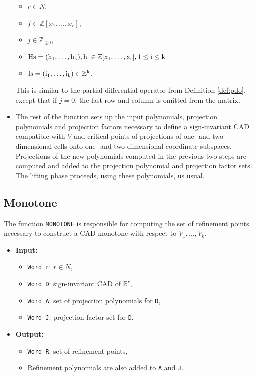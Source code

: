 \documentclass[
]{book}
\providecommand{\tightlist}{%
  \setlength{\itemsep}{0pt}\setlength{\parskip}{0pt}}
\theoremstyle{definition}
\theoremstyle{definition}
\theoremstyle{definition}
\theoremstyle{definition}
\theoremstyle{remark}
\begin{document}
\begin{itemize}
  \begin{itemize}
  \tightlist
  \item
    \(r \in N\),
  \item
    \(f \in \mathbb{Z}[x_1,\ldots,x_r]\),
  \item
    \(j \in \mathbb{Z}_{\ge 0}\)
  \item
    \(\rm{Hs} = (h_1,\ldots,h_k), h_i \in \mathbb{Z}[x_1,\ldots,x_r], 1 \le i \le k\)
  \item
    \(\rm{Is} = (i_1,\ldots,i_k) \in \mathbb{Z}^k\).
  \end{itemize}

  This is similar to the partial differential operator from Definition \ref{def:pdo}, except that if \(j = 0\), the last row and column is omitted from the matrix.
\item
  The rest of the function sets up the input polynomials, projection polynomials and projection factors necessary to define a sign-invariant CAD compatible with \(V\) and critical points of projections of one- and two-dimensional cells onto one- and two-dimensional coordinate subspaces. Projections of the new polynomials computed in the previous two steps are computed and added to the projection polynomial and projection factor sets.
  The lifting phase proceeds, using these polynomials, us usual.
\end{itemize}

\hypertarget{monotone}{%
\subsection{Monotone}\label{monotone}}

The function \texttt{MONOTONE} is responsible for computing the set of refinement points necessary to construct a CAD monotone with respect to \(V_1,\ldots,V_k\).

\begin{itemize}
\tightlist
\item
  \textbf{Input:}

  \begin{itemize}
  \tightlist
  \item
    \texttt{Word\ r}: \(r\in N\),
  \item
    \texttt{Word\ D}: sign-invariant CAD of \(\mathbb{R}^r\),
  \item
    \texttt{Word\ A}: set of projection polynomials for \texttt{D},
  \item
    \texttt{Word\ J}: projection factor set for \texttt{D}.
  \end{itemize}
\item
  \textbf{Output:}

  \begin{itemize}
  \tightlist
  \item
    \texttt{Word\ R}: set of refinement points,
  \item
    Refinement polynomials are also added to \texttt{A} and \texttt{J}.
  \end{itemize}
\end{itemize}
\end{document}

